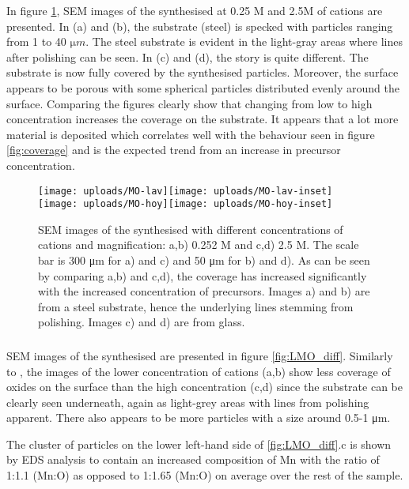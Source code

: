 \documentclass[Main/main.tex]{subfiles}
\begin{document}
In figure \ref{fig:MnO2_diff}, SEM images of the synthesised  at 0.25 M and 2.5M of cations are presented. In (a) and (b), the substrate (steel) is specked with particles ranging from 1 to 40 $\si{\micro m}$. The steel substrate is evident in the light-gray areas where lines after polishing can be seen. In (c) and (d), the story is quite different. The substrate is now fully covered by the synthesised particles. Moreover, the surface appears to be porous with some spherical particles distributed evenly around the surface.
Comparing the figures clearly show that changing from low to high concentration increases the coverage on the substrate. It appears that a lot more material is deposited which correlates well with the behaviour seen in figure \ref{fig:coverage} and is the expected trend from an increase in precursor concentration. 


\begin{figure}[ht] 
    \centering
	\texttt{[image: uploads/MO-lav]}\texttt{[image: uploads/MO-lav-inset]} \\
	\texttt{[image: uploads/MO-hoy]}\texttt{[image: uploads/MO-hoy-inset]}
	\caption{SEM images of the synthesised  with different concentrations of cations and magnification: a,b) 0.252 M and c,d) 2.5 M. The scale bar is 300 \si{\micro m} for a) and c) and 50 \si{\micro m} for b) and d). As can be seen by comparing a,b) and c,d), the coverage has increased significantly with the increased concentration of precursors. Images a) and b) are from a steel substrate, hence the underlying lines stemming from polishing. Images c) and d) are from glass.}
	\label{fig:MnO2_diff}
\end{figure}


\FloatBarrier
\subsubsection{}
SEM images of the synthesised  are presented in figure \ref{fig:LMO_diff}. Similarly to , the images of the lower concentration of cations (a,b) show less coverage of oxides on the surface than the high concentration (c,d) since the substrate can be clearly seen underneath, again as light-grey areas with lines from polishing apparent. There also appears to be more particles with a size around 0.5-1 \si{\micro m}.

The cluster of particles on the lower left-hand side of \ref{fig:LMO_diff}.c is shown by EDS analysis to contain an increased composition of Mn with the ratio of 1:1.1 (Mn:O) as opposed to 1:1.65 (Mn:O) on average over the rest of the sample. 
\end{document}
